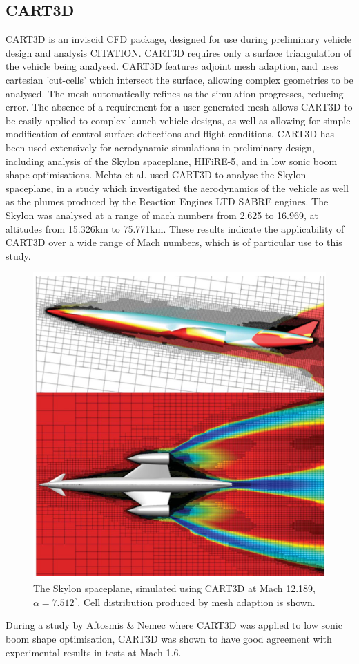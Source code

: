 \subsection{CART3D}
CART3D is an inviscid CFD package, designed for use during preliminary vehicle design and analysis CITATION. CART3D requires only a surface triangulation of the vehicle being analysed. CART3D features adjoint mesh adaption, and uses cartesian 'cut-cells' which intersect the surface, allowing complex geometries to be analysed. The mesh automatically refines as the simulation progresses, reducing error. The absence of a requirement for a user generated mesh allows CART3D to be easily applied to complex launch vehicle designs, as well as allowing for simple modification of control surface deflections and flight conditions. 
CART3D has been used extensively for aerodynamic simulations in preliminary design, including analysis of the Skylon spaceplane\cite{Mehta2016}, HIFiRE-5\cite{Kimmel2010}, and in low sonic boom shape optimisations\cite{Aftosmis2011}. 
Mehta et al. used CART3D to analyse the Skylon spaceplane, in a study which investigated the aerodynamics of the vehicle as well as the plumes produced by the Reaction Engines LTD SABRE engines\cite{Mehta2016}. The Skylon was analysed at a range of mach numbers from 2.625 to 16.969, at altitudes from 15.326km to 75.771km. These results indicate the applicability of CART3D over a wide range of Mach numbers, which is of particular use to this study.
\begin{figure}
\centering
\includegraphics[width=0.6\linewidth]{figures/2_literature-review/Skylon-CART3D}
\caption{The Skylon spaceplane, simulated using CART3D at Mach 12.189, $\alpha=7.512^\circ$\cite{Mehta2016}. Cell distribution produced by mesh adaption is shown.}
\label{fig:Skylon-CART3D}
\end{figure}
During a study by Aftosmis \& Nemec where CART3D was applied to low sonic boom shape optimisation, CART3D was shown to have good agreement with experimental results in tests at Mach 1.6. 

